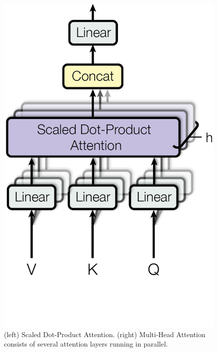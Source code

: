 \begin{figure}[htbp]
\begin{minipage}[t]{0.5\textwidth}
  \vspace{0.1cm}
  \includegraphics[scale=0.6]{assets/ModalNet-20}  
\end{minipage}
  \caption{(left) Scaled Dot-Product Attention. (right) Multi-Head Attention consists of several attention layers running in parallel.}
  \label{fig:multi-head-att}
\end{figure}